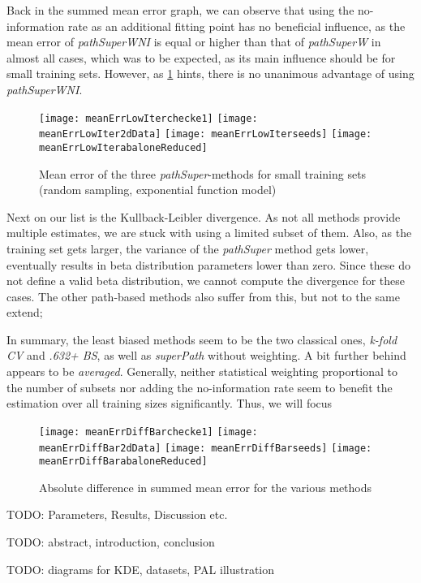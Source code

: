 Back in the summed mean error graph, we can observe that using the no-information rate as an additional fitting point has no beneficial influence, as the mean error of \textit{pathSuperWNI} is equal or higher than that of \textit{pathSuperW} in almost all cases, which was to be expected, as its main influence should be for small training sets. However, as \ref{fig:meanErrorLowIter} hints, there is no unanimous advantage of using \textit{pathSuperWNI}.

\begin{figure}[h]
	\centering
	\texttt{[image: meanErrLowIterchecke1]}
	\texttt{[image: meanErrLowIter2dData]}
	\texttt{[image: meanErrLowIterseeds]}
	\texttt{[image: meanErrLowIterabaloneReduced]}
	\caption{Mean error of the three \textit{pathSuper}-methods for small training sets (random sampling, exponential function model)}
	\label{fig:meanErrorLowIter}
\end{figure}

Next on our list is the Kullback-Leibler divergence. As not all methods provide multiple estimates, we are stuck with using a limited subset of them. Also, as the training set gets larger, the variance of the \textit{pathSuper} method gets lower, eventually results in beta distribution parameters lower than zero. Since these do not define a valid beta distribution, we cannot compute the divergence for these cases. The other path-based methods also suffer from this, but not to the same extend; 

In summary, the least biased methods seem to be the two classical ones, \textit{k-fold CV} and \textit{.632+ BS}, as well as \textit{superPath} without weighting. A bit further behind appears to be \textit{averaged}. Generally, neither statistical weighting proportional to the number of subsets nor adding the no-information rate seem to benefit the estimation over all training sizes significantly. Thus, we will focus 



\begin{figure}[h]
	\centering
	\texttt{[image: meanErrDiffBarchecke1]}
	\texttt{[image: meanErrDiffBar2dData]}
	\texttt{[image: meanErrDiffBarseeds]}
	\texttt{[image: meanErrDiffBarabaloneReduced]}
	\caption{Absolute difference in summed mean error for the various methods}
	\label{fig:meanErrorDiffBars}
\end{figure}


TODO: Parameters, Results, Discussion etc.

TODO: abstract, introduction, conclusion

TODO: diagrams for KDE, datasets, PAL illustration
